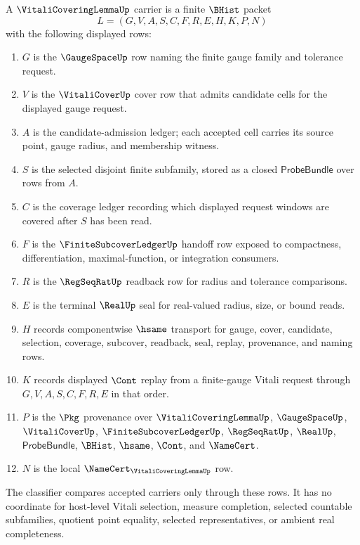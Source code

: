 \begin{definition}
\label{def:vitali-covering-lemma-carrier}
A $\VitaliCoveringLemmaUp$ carrier is a finite $\BHist$ packet
$$
L=(G,V,A,S,C,F,R,E,H,K,P,N)
$$
with the following displayed rows:
\begin{enumerate}
\item $G$ is the $\GaugeSpaceUp$ row naming the finite gauge family and tolerance request.
\item $V$ is the $\VitaliCoverUp$ cover row that admits candidate cells for the displayed gauge request.
\item $A$ is the candidate-admission ledger; each accepted cell carries its source point, gauge radius, and membership witness.
\item $S$ is the selected disjoint finite subfamily, stored as a closed $\mathsf{ProbeBundle}$ over rows from $A$.
\item $C$ is the coverage ledger recording which displayed request windows are covered after $S$ has been read.
\item $F$ is the $\FiniteSubcoverLedgerUp$ handoff row exposed to compactness, differentiation, maximal-function, or integration consumers.
\item $R$ is the $\RegSeqRatUp$ readback row for radius and tolerance comparisons.
\item $E$ is the terminal $\RealUp$ seal for real-valued radius, size, or bound reads.
\item $H$ records componentwise $\hsame$ transport for gauge, cover, candidate, selection, coverage, subcover, readback, seal, replay, provenance, and naming rows.
\item $K$ records displayed $\Cont$ replay from a finite-gauge Vitali request through $G,V,A,S,C,F,R,E$ in that order.
\item $P$ is the $\Pkg$ provenance over $\VitaliCoveringLemmaUp$, $\GaugeSpaceUp$, $\VitaliCoverUp$, $\FiniteSubcoverLedgerUp$, $\RegSeqRatUp$, $\RealUp$, $\mathsf{ProbeBundle}$, $\BHist$, $\hsame$, $\Cont$, and $\NameCert$.
\item $N$ is the local $\NameCert_{\VitaliCoveringLemmaUp}$ row.
\end{enumerate}
The classifier compares accepted carriers only through these rows. It has no coordinate for host-level Vitali selection, measure completion, selected countable subfamilies, quotient point equality, selected representatives, or ambient real completeness.
\end{definition}

